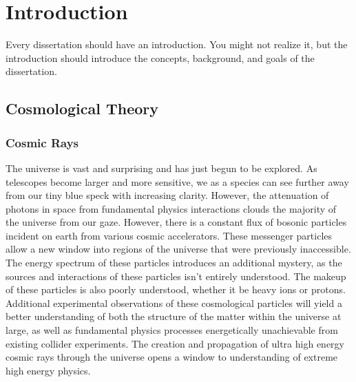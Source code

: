 


\chapter{Introduction}

Every dissertation should have an introduction.  You might not realize
it, but the introduction should introduce the concepts, background,
and goals of the dissertation.

\section{Cosmological Theory}
	\subsection{Cosmic Rays}
		The universe is vast and surprising and has just begun to be explored.  As telescopes become larger and more sensitive, we as a species can see further away from our tiny blue speck with increasing clarity.  However, the attenuation of photons in space from fundamental physics interactions clouds the majority of the universe from our gaze.  However, there is a constant flux of bosonic particles incident on earth from various cosmic accelerators.  These messenger particles allow a new window into regions of the universe that were previously inaccessible.  The energy spectrum of these particles introduces an additional mystery, as the sources and interactions of these particles isn't entirely understood.  The makeup of these particles is also poorly understood, whether it be heavy ions or protons.  Additional experimental observations of these cosmological particles will yield a better understanding of both the structure of the matter within the universe at large, as well as fundamental physics processes energetically unachievable from existing collider experiments.  The creation and propagation of ultra high energy cosmic rays through the universe opens a window to understanding of extreme high energy physics.
